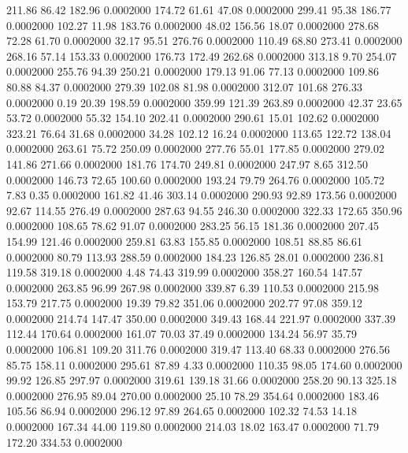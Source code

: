  211.86   86.42  182.96   0.0002000
 174.72   61.61   47.08   0.0002000
 299.41   95.38  186.77   0.0002000
 102.27   11.98  183.76   0.0002000
  48.02  156.56   18.07   0.0002000
 278.68   72.28   61.70   0.0002000
  32.17   95.51  276.76   0.0002000
 110.49   68.80  273.41   0.0002000
 268.16   57.14  153.33   0.0002000
 176.73  172.49  262.68   0.0002000
 313.18    9.70  254.07   0.0002000
 255.76   94.39  250.21   0.0002000
 179.13   91.06   77.13   0.0002000
 109.86   80.88   84.37   0.0002000
 279.39  102.08   81.98   0.0002000
 312.07  101.68  276.33   0.0002000
   0.19   20.39  198.59   0.0002000
 359.99  121.39  263.89   0.0002000
  42.37   23.65   53.72   0.0002000
  55.32  154.10  202.41   0.0002000
 290.61   15.01  102.62   0.0002000
 323.21   76.64   31.68   0.0002000
  34.28  102.12   16.24   0.0002000
 113.65  122.72  138.04   0.0002000
 263.61   75.72  250.09   0.0002000
 277.76   55.01  177.85   0.0002000
 279.02  141.86  271.66   0.0002000
 181.76  174.70  249.81   0.0002000
 247.97    8.65  312.50   0.0002000
 146.73   72.65  100.60   0.0002000
 193.24   79.79  264.76   0.0002000
 105.72    7.83    0.35   0.0002000
 161.82   41.46  303.14   0.0002000
 290.93   92.89  173.56   0.0002000
  92.67  114.55  276.49   0.0002000
 287.63   94.55  246.30   0.0002000
 322.33  172.65  350.96   0.0002000
 108.65   78.62   91.07   0.0002000
 283.25   56.15  181.36   0.0002000
 207.45  154.99  121.46   0.0002000
 259.81   63.83  155.85   0.0002000
 108.51   88.85   86.61   0.0002000
  80.79  113.93  288.59   0.0002000
 184.23  126.85   28.01   0.0002000
 236.81  119.58  319.18   0.0002000
   4.48   74.43  319.99   0.0002000
 358.27  160.54  147.57   0.0002000
 263.85   96.99  267.98   0.0002000
 339.87    6.39  110.53   0.0002000
 215.98  153.79  217.75   0.0002000
  19.39   79.82  351.06   0.0002000
 202.77   97.08  359.12   0.0002000
 214.74  147.47  350.00   0.0002000
 349.43  168.44  221.97   0.0002000
 337.39  112.44  170.64   0.0002000
 161.07   70.03   37.49   0.0002000
 134.24   56.97   35.79   0.0002000
 106.81  109.20  311.76   0.0002000
 319.47  113.40   68.33   0.0002000
 276.56   85.75  158.11   0.0002000
 295.61   87.89    4.33   0.0002000
 110.35   98.05  174.60   0.0002000
  99.92  126.85  297.97   0.0002000
 319.61  139.18   31.66   0.0002000
 258.20   90.13  325.18   0.0002000
 276.95   89.04  270.00   0.0002000
  25.10   78.29  354.64   0.0002000
 183.46  105.56   86.94   0.0002000
 296.12   97.89  264.65   0.0002000
 102.32   74.53   14.18   0.0002000
 167.34   44.00  119.80   0.0002000
 214.03   18.02  163.47   0.0002000
  71.79  172.20  334.53   0.0002000
